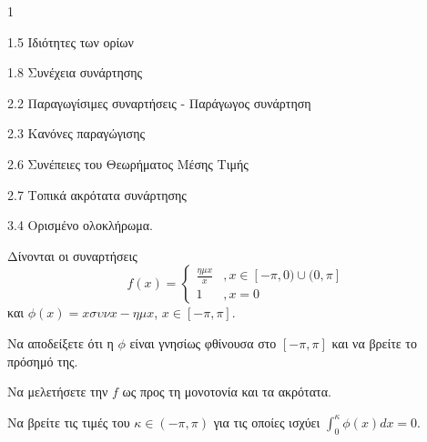 \begin{ylh}{1}
    \item 1.5 Ιδιότητες των ορίων
    \item 1.8 Συνέχεια συνάρτησης
    \item 2.2 Παραγωγίσιμες συναρτήσεις - Παράγωγος συνάρτηση
    \item 2.3 Κανόνες παραγώγισης
    \item 2.6 Συνέπειες του Θεωρήματος Μέσης Τιμής
    \item 2.7 Τοπικά ακρότατα συνάρτησης
    \item 3.4 Ορισμένο ολοκλήρωμα.
\end{ylh}
Δίνονται οι συναρτήσεις
\[ f(x) = \begin{cases} \frac{\eta\mu x}{x} & , x \in [-\pi,0) \cup (0,\pi] \\ 1 & , x=0 \end{cases} \]
και $\phi(x) = x\sigma\upsilon\nu x - \eta\mu x$, $x \in [-\pi,\pi]$.
\begin{alist}
\item Να αποδείξετε ότι η $\phi$ είναι γνησίως φθίνουσα στο $[-\pi,\pi]$ και να βρείτε το πρόσημό της. 
\item Να μελετήσετε την $f$ ως προς τη μονοτονία και τα ακρότατα. 
\item Να βρείτε τις τιμές του $\kappa \in (-\pi,\pi)$ για τις οποίες ισχύει $\int_0^\kappa \phi(x)dx=0$. 
\end{alist}